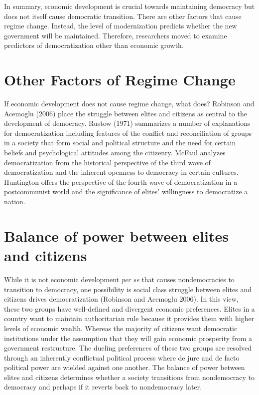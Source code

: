 \documentclass[12pt,]{article}
\begin{document}
In summary, economic development is crucial towards maintaining
democracy but does not itself cause democratic transition. There are
other factors that cause regime change. Instead, the level of
modernization predicts whether the new government will be maintained.
Therefore, researchers moved to examine predictors of democratization
other than economic growth.

\hypertarget{other-factors-of-regime-change}{%
\section{Other Factors of Regime
Change}\label{other-factors-of-regime-change}}

If economic development does not cause regime change, what does?
Robinson and Acemoglu (2006) place the struggle between elites and
citizens as central to the development of democracy. Rustow (1971)
summarizes a number of explanations for democratization including
features of the conflict and reconciliation of groups in a society that
form social and political structure and the need for certain beliefs and
psychological attitudes among the citizenry. McFaul analyzes
democratization from the historical perspective of the third wave of
democratization and the inherent openness to democracy in certain
cultures. Huntington offers the perspective of the fourth wave of
democratization in a postcommunist world and the significance of elites'
willingness to democratize a nation.

\hypertarget{balance-of-power-between-elites-and-citizens}{%
\section{Balance of power between elites and
citizens}\label{balance-of-power-between-elites-and-citizens}}

While it is not economic development \emph{per se} that causes
nondemocracies to transition to democracy, one possibility is social
class struggle between elites and citizens drives democratization
(Robinson and Acemoglu 2006). In this view, these two groups have
well-defined and divergent economic preferences. Elites in a country
want to maintain authoritarian rule because it provides them with higher
levels of economic wealth. Whereas the majority of citizens want
democratic institutions under the assumption that they will gain
economic prosperity from a government restructure. The dueling
preferences of these two groups are resolved through an inherently
conflictual political process where de jure and de facto political power
are wielded against one another. The balance of power between elites and
citizens determines whether a society transitions from nondemocracy to
democracy and perhaps if it reverts back to nondemocracy later.
\end{document}
